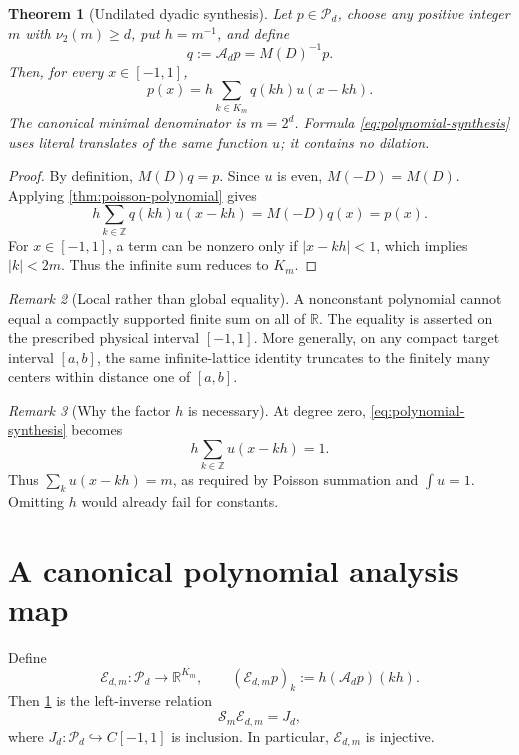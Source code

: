 \documentclass[11pt,oneside]{book}
\newtheorem{theorem}{Theorem}[chapter]
\theoremstyle{definition}
\theoremstyle{remark}
\newtheorem{remark}[theorem]{Remark}
\newcommand{\R}{\mathbb R}
\newcommand{\Z}{\mathbb Z}
\newcommand{\Pp}{\mathcal P}
\newcommand{\Aop}{\mathcal A}
\newcommand{\Sop}{\mathcal S}
\newcommand{\Eop}{\mathcal E}
\newcommand{\vtwo}{\nu_2}
\begin{document}
\begin{theorem}[Undilated dyadic synthesis]
\label{thm:polynomial-synthesis}
Let \(p\in\Pp_d\), choose any positive integer \(m\) with \(\vtwo(m)\ge d\), put \(h=m^{-1}\), and define
\begin{equation}
 q:=\Aop_dp=M(D)^{-1}p.
 \label{eq:q-definition}
\end{equation}
Then, for every \(x\in[-1,1]\),
\begin{equation}
 p(x)=h\sum_{k\in K_m}q(kh)u(x-kh).
 \label{eq:polynomial-synthesis}
\end{equation}
The canonical minimal denominator is \(m=2^d\).  Formula \cref{eq:polynomial-synthesis} uses literal translates of the same function \(u\); it contains no dilation.
\end{theorem}

\begin{proof}
By definition, \(M(D)q=p\).  Since \(u\) is even, \(M(-D)=M(D)\).  Applying \cref{thm:poisson-polynomial} gives
\[
 h\sum_{k\in\Z}q(kh)u(x-kh)
 =M(-D)q(x)=p(x).
\]
For \(x\in[-1,1]\), a term can be nonzero only if \(|x-kh|<1\), which implies \(|k|<2m\).  Thus the infinite sum reduces to \(K_m\).
\end{proof}

\begin{remark}[Local rather than global equality]
A nonconstant polynomial cannot equal a compactly supported finite sum on all of \(\R\).  The equality is asserted on the prescribed physical interval \([-1,1]\).  More generally, on any compact target interval \([a,b]\), the same infinite-lattice identity truncates to the finitely many centers within distance one of \([a,b]\).
\end{remark}

\begin{remark}[Why the factor \(h\) is necessary]
At degree zero, \cref{eq:polynomial-synthesis} becomes
\[
 h\sum_{k\in\Z}u(x-kh)=1.
\]
Thus \(\sum_k u(x-kh)=m\), as required by Poisson summation and \(\int u=1\).  Omitting \(h\) would already fail for constants.
\end{remark}

\section{A canonical polynomial analysis map}
Define
\begin{equation}
 \Eop_{d,m}:\Pp_d\longrightarrow\R^{K_m},
 \qquad
 (\Eop_{d,m}p)_k
 :=h(\Aop_dp)(kh).
 \label{eq:analysis-map}
\end{equation}
Then \cref{thm:polynomial-synthesis} is the left-inverse relation
\begin{equation}
 \Sop_m\Eop_{d,m}=J_d,
 \label{eq:synthesis-analysis-left-inverse}
\end{equation}
where \(J_d:\Pp_d\hookrightarrow C[-1,1]\) is inclusion.  In particular, \(\Eop_{d,m}\) is injective.
\end{document}
